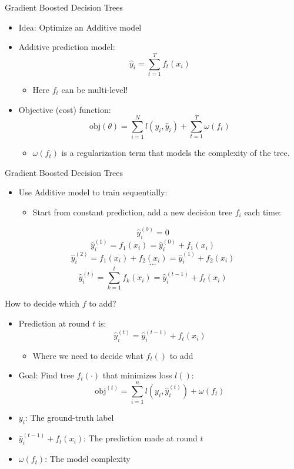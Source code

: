 \begin{frame}{Gradient Boosted Decision Trees}
\begin{itemize}
    \item Idea: Optimize an Additive model
    \item Additive prediction model:
    \[
        \hat{y}_i = \sum_{t=1}^{T} f_t(x_i)
    \]
    \begin{itemize}
        \item Here $f_t$ can be multi-level!
    \end{itemize}
    \item Objective (cost) function:
    \[
        \text{obj}(\theta) = \sum_{i=1}^{N} l(y_i, \hat{y}_i) + \sum_{t=1}^{T} \omega(f_t)
    \]
    \begin{itemize}
        \item $\omega(f_t)$ is a regularization term that models the complexity of the tree.
    \end{itemize}
\end{itemize}
\end{frame}

\begin{frame}{Gradient Boosted Decision Trees}
\begin{itemize}
    \item Use Additive model to train sequentially:
    \begin{itemize}
        \item Start from constant prediction, add a new decision tree $f_i$ each time:
    \end{itemize}
\end{itemize}

\[
    \hat{y}_i^{(0)} = 0
\]
\[
    \hat{y}_i^{(1)} = f_1(x_i) = \hat{y}_i^{(0)} + f_1(x_i)
\]
\[
    \hat{y}_i^{(2)} = f_1(x_i) + f_2(x_i) = \hat{y}_i^{(1)} + f_2(x_i)
\]
\[
    \cdots
\]
\[
    \hat{y}_i^{(t)} = \sum_{k=1}^{t} f_k(x_i) = \hat{y}_i^{(t-1)} + f_t(x_i)
\]
\end{frame}


\begin{frame}{How to decide which \( f \) to add?}
\begin{itemize}
    \item Prediction at round \( t \) is: 
    \[
        \hat{y}_i^{(t)} = \hat{y}_i^{(t-1)} + f_t(x_i)
    \]
    \begin{itemize}
        \item Where we need to decide what \( f_t() \) to add
    \end{itemize}

    \item Goal: Find tree \( f_t(\cdot) \) that minimizes loss \( l() \):
    \[
        \text{obj}^{(t)} = \sum_{i=1}^{n} l\left(y_i, \hat{y}_i^{(t)}\right) + \omega(f_t)
    \]
    
    \item \( y_i \): The ground-truth label
    \item \( \hat{y}_i^{(t-1)} + f_t(x_i) \): The prediction made at round \( t \)
    \item \( \omega(f_t) \): The model complexity
\end{itemize}
\end{frame}


